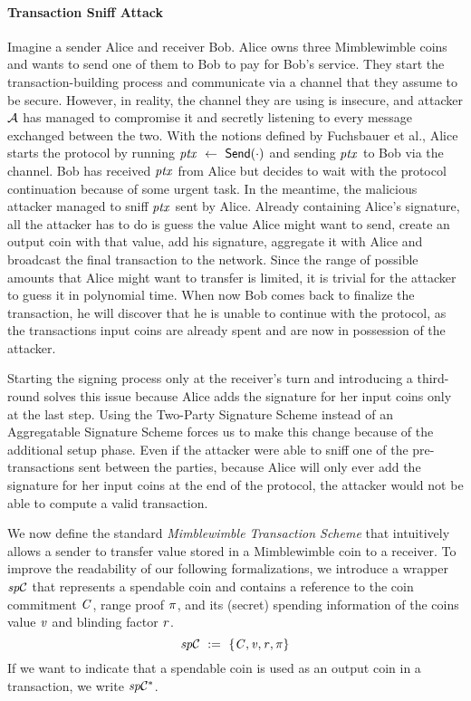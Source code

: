\paragraph{Transaction Sniff Attack}
Imagine a sender Alice and receiver Bob.
Alice owns three Mimblewimble coins and wants to send one of them to Bob to pay for Bob's service.
They start the transaction-building process and communicate via a channel that they assume to be secure.
However, in reality, the channel they are using is insecure, and attacker $\mathcal{A}$ has managed to compromise it and secretly listening to every message exchanged between the two.
With the notions defined by Fuchsbauer et al., Alice starts the protocol by running $\mathit{ptx} ~\leftarrow~ \mathsf{Send}(\cdot)$ and sending $\mathit{ptx}$ to Bob via the channel.
Bob has received $\mathit{ptx}$ from Alice but decides to wait with the protocol continuation because of some urgent task.
In the meantime, the malicious attacker managed to sniff $\mathit{ptx}$ sent by Alice.
Already containing Alice's signature, all the attacker has to do is guess the value Alice might want to send, create an output coin with that value, add his signature, aggregate it with Alice and broadcast the final transaction to the network.
Since the range of possible amounts that Alice might want to transfer is limited, it is trivial for the attacker to guess it in polynomial time.
When now Bob comes back to finalize the transaction, he will discover that he is unable to continue with the protocol, as the transactions input coins are already spent and are now in possession of the attacker.

Starting the signing process only at the receiver's turn and introducing a third-round solves this issue because Alice adds the signature for her input coins only at the last step.
Using the Two-Party Signature Scheme instead of an Aggregatable Signature Scheme forces us to make this change because of the additional setup phase.
Even if the attacker were able to sniff one of the pre-transactions sent between the parties, because Alice will only ever add the signature for her input coins at the end of the protocol, the attacker would not be able to compute a valid transaction.

We now define the standard \emph{Mimblewimble Transaction Scheme} that intuitively allows a sender to transfer value stored in a Mimblewimble coin to a receiver.
To improve the readability of our following formalizations, we introduce a wrapper $\mathit{sp}\mathcal{C}$ that represents a spendable coin and contains a reference to the coin commitment $\mathit{C}$, range proof $\pi$, and its (secret) spending information of the coins value $\mathit{v}$ and blinding factor $\mathit{r}$.
\[ \mathit{sp}\mathcal{C} ~:=~ \{ \mathit{C}, \mathit{v}, \mathit{r}, \pi \} \]
If we want to indicate that a spendable coin is used as an output coin in a transaction, we write $\mathit{sp}\mathcal{C}^*$.

